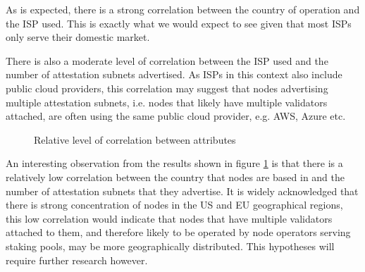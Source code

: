 \documentclass[conference]{IEEEtran}
\begin{document}
As is expected, there is a strong correlation between the country of operation and the ISP used.  This is exactly what we would expect to see given that most ISPs only serve their domestic market.

There is also a moderate level of correlation between the ISP used and the number of attestation subnets advertised.  As ISPs in this context also include public cloud providers, this correlation may suggest that nodes advertising multiple attestation subnets, i.e. nodes that likely have multiple validators attached, are often using the same public cloud provider, e.g. AWS, Azure etc.

\vspace{12pt}

\begin{figure}[htbp]
    \centering
    \caption{Relative level of correlation between attributes}
    \label{fig:relative-level-of-correlation-between-attributes}
\end{figure}

An interesting observation from the results shown in figure \ref{fig:relative-level-of-correlation-between-attributes} is that there is a relatively low correlation between the country that nodes are based in and the number of attestation subnets that they advertise.  It is widely acknowledged that there is  strong concentration of nodes in the US and EU geographical regions, this low correlation would indicate that nodes that have multiple validators attached to them, and therefore likely to be operated by node operators serving staking pools, may be more geographically distributed.  This hypotheses will require further research however.
\end{document}
